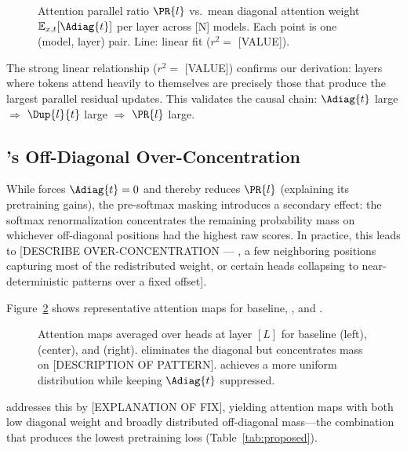 \begin{figure}[t]
  \centering
  \fbox{\rule{0pt}{4.5cm}\rule{0.85\linewidth}{0pt}}
  \caption{Attention parallel ratio $\PR{l}$ vs.\ mean diagonal attention
           weight $\mathbb{E}_{x,t}[\Adiag{t}]$ per layer across [N] models.
           Each point is one (model, layer) pair.  Line: linear fit ($r^2 =$ [VALUE]).}
  \label{fig:diagonal}
\end{figure}

The strong linear relationship ($r^2 = $ [VALUE]) confirms our derivation:
layers where tokens attend heavily to themselves are precisely those that
produce the largest parallel residual updates.  This validates the causal
chain: $\Adiag{t}$ large $\Rightarrow$ $\Dup{l}{t}$ large $\Rightarrow$
$\PR{l}$ large.

\subsection{\xsa's Off-Diagonal Over-Concentration}
\label{sec:xsa-analysis}

While \xsa{} forces $\Adiag{t} = 0$ and thereby reduces $\PR{l}$
(explaining its pretraining gains), the pre-softmax masking introduces a
secondary effect: the softmax renormalization concentrates the remaining
probability mass on whichever off-diagonal positions had the highest raw
scores.  In practice, this leads to [DESCRIBE OVER-CONCENTRATION — \eg,
a few neighboring positions capturing most of the redistributed weight,
or certain heads collapsing to near-deterministic patterns over a fixed
offset].

Figure~\ref{fig:attn-maps} shows representative attention maps for
baseline, \xsa{}, and \method{}.

\begin{figure}[t]
  \centering
  \fbox{\rule{0pt}{5cm}\rule{0.9\linewidth}{0pt}}
  \caption{Attention maps averaged over heads at layer $[L]$ for baseline
           (left), \xsa{} (center), and \method{} (right).
           \xsa{} eliminates the diagonal but concentrates mass on
           [DESCRIPTION OF PATTERN].
           \method{} achieves a more uniform distribution while keeping
           $\Adiag{t}$ suppressed.}
  \label{fig:attn-maps}
\end{figure}

\method{} addresses this by [EXPLANATION OF FIX], yielding attention maps
with both low diagonal weight and broadly distributed off-diagonal mass—the
combination that produces the lowest pretraining loss
(Table~\ref{tab:proposed}).
